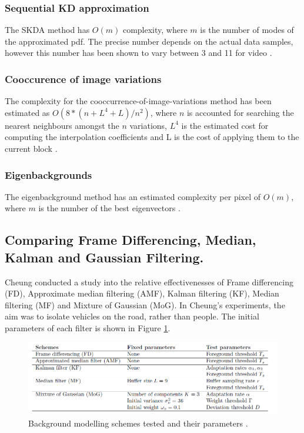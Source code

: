 \subsubsection{Sequential KD approximation}

The SKDA method has $O(m)$ complexity, where $m$ is the number of modes of
the approximated pdf. 
The precise number depends on the actual data samples, however this number has been shown to vary between 3 and 11 for video \cite{Han2007}.\\

\subsubsection{Cooccurence of image variations}

The complexity for the cooccurrence-of-image-variations method has been
estimated as $O(8*(n+L^4+L)/n^2)$, where $n$ is accounted for searching the nearest neighbours amongst the $n$ variations, $L^4$ is the estimated cost for computing the interpolation coefficients and L is the cost of applying them to the current block \cite{Piccardi2004}.\\

\subsubsection{Eigenbackgrounds}

The eigenbackground method has an estimated complexity per pixel of $O(m)$, where $m$ is the number of the best eigenvectors \cite{Piccardi2004}.\\

\subsection{Comparing Frame Differencing, Median, Kalman and Gaussian Filtering.}
Cheung \cite{Cheung2007} conducted a study into the relative effectivenesses of Frame differencing (FD), Approximate median filtering (AMF), Kalman filtering (KF), Median filtering (MF) and Mixture of Gaussian (MoG). In Cheung's experiments, the aim was to isolate vehicles on the road, rather than people. The initial parameters of each filter is shown in Figure \ref{fig:background modelling schemes tested and their parameters}.\\

\begin{figure}[h]
\begin{center}
\includegraphics[scale=0.4]{./research/schemes} 
\end{center}
\caption{Background modelling schemes tested and their parameters \cite{Cheung2007}.}
\label{fig:background modelling schemes tested and their parameters}
\end{figure}

